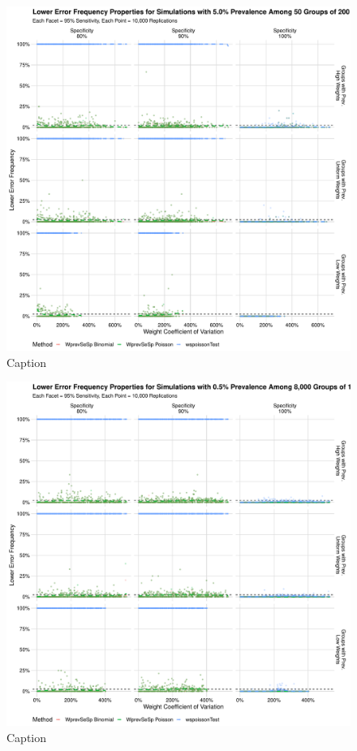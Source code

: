 \documentclass[AMA,STIX1COL]{WileyNJD-v2}
\begin{document}
\begin{figure}
\centering
\includegraphics[width=\textwidth]{figures/imperfect_lower_error_frequency_50_groups_0_05_prev.pdf}
\caption{Caption}
\label{fig:imperfect_lower_error_frequency_50_groups_0_05_prev}
\end{figure}

\begin{figure}
\centering
\includegraphics[width=\textwidth]{figures/imperfect_lower_error_frequency_8000_groups_0_005_prev.pdf}
\caption{Caption}
\label{fig:imperfect_lower_error_frequency_8000_groups_0_005_prev}
\end{figure}
\end{document}
